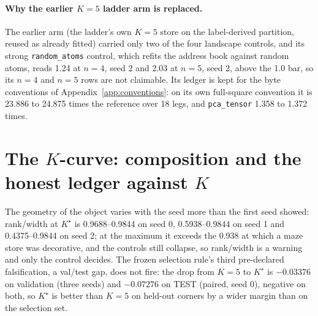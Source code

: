 \documentclass{article} %
\newcommand{\Kstar}{\ensuremath{K^{\star}}}
\begin{document}
\paragraph{Why the earlier $K=5$ ladder arm is replaced.} The earlier arm (the ladder's own
$K=5$ store on the label-derived partition, reused as already fitted) carried only two of the four
landscape controls, and its strong \texttt{random\_atoms} control, which refits the address book
against random atoms, reads 1.24 at $n=4$, seed 2 and 2.03 at $n=5$, seed 2, above the 1.0 bar, so %
its $n=4$ and $n=5$ rows are not claimable. Its ledger is kept for the byte conventions of
Appendix~\ref{app:conventions}: on its own full-square convention it is 23.886 to 24.875 times the %
reference over 18 legs, and \texttt{pca\_tensor} 1.358 to 1.372 times. %
\section{The $K$-curve: composition and the honest ledger against $K$}
\label{app:kcurve}

The geometry of the object varies with the seed more than the first seed showed:
rank/width at $\Kstar$ is 0.9688--0.9844 on seed 0, 0.5938--0.9844 on seed 1 and
0.4375--0.9844 on seed 2; at the maximum it exceeds the 0.938 at which a maze store was
decorative, and the controls still collapse, so rank/width is a warning and only the control
decides. %
The frozen selection rule's third pre-declared falsification, a val/test gap, does not fire:
the drop from $K=5$ to $\Kstar$ is $-0.03376$ on validation (three seeds) and $-0.07276$ on
TEST (paired, seed 0), negative on both, so $\Kstar$ is better than $K=5$ on held-out corners
by a wider margin than on the selection set. %
\end{document}
